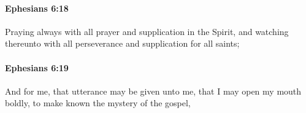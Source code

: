 		\paragraph{Ephesians 6:18} %
			\label{EPHESIANS-6-18}

			Praying always with all prayer and supplication in the Spirit, and watching thereunto with all perseverance and supplication for all saints;

			\begin{framed}
			\scriptsize
				\begin{compactdesc}
					\item[SBLG] 
				\end{compactdesc}
			\end{framed}

		\paragraph{Ephesians 6:19} %
			\label{EPHESIANS-6-19}

			And for me, that utterance may be given unto me, that I may open my mouth boldly, to make known the mystery of the gospel,

